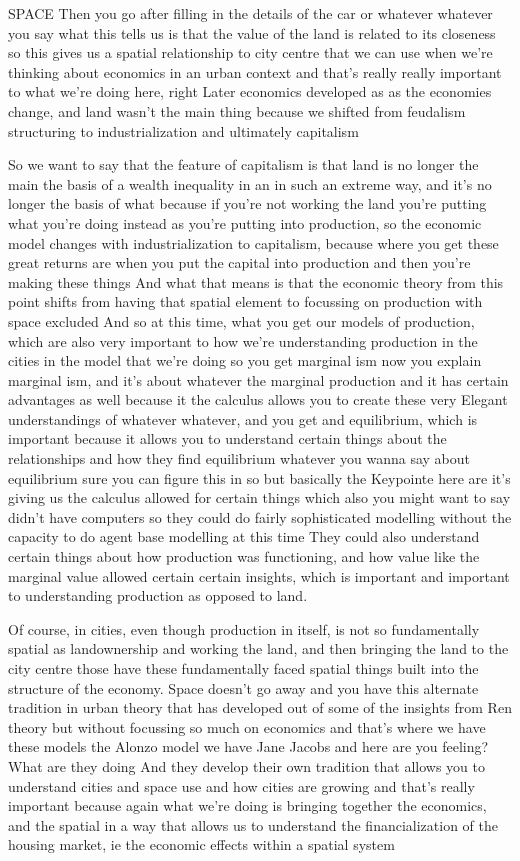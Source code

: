 SPACE
Then you go after filling in the details of the car or whatever whatever you say what this tells us is that the value of the land is related to its closeness so this gives us a spatial relationship to city centre that we can use when we’re thinking about economics in an urban context and that’s really really important to what we’re doing here, right
Later economics developed as as the economies change, and land wasn’t the main thing because we shifted from feudalism structuring to industrialization and ultimately capitalism

So we want to say that the feature of capitalism is that land is no longer the main the basis of a wealth inequality in an in such an extreme way, and it’s no longer the basis of what because if you’re not working the land you’re putting what you’re doing instead as you’re putting into production, so the economic model changes with industrialization to capitalism, because where you get these great returns are when you put the capital into production and then you’re making these things
And what that means is that the economic theory from this point shifts from having that spatial element to focussing on production with space excluded
And so at this time, what you get our models of production, which are also very important to how we’re understanding production in the cities in the model that we’re doing so you get marginal ism now you explain marginal ism, and it’s about whatever the marginal production and it has certain advantages as well because it the calculus allows you to create these very Elegant understandings of whatever whatever, and you get and equilibrium, which is important because it allows you to understand certain things about the relationships and how they find equilibrium whatever you wanna say about equilibrium sure you can figure this in so but basically the Keypointe here are it’s giving us the calculus allowed for certain things which also you might want to say didn’t have computers so they could do fairly sophisticated modelling without the capacity to do agent base modelling at this time They could also understand certain things about how production was functioning, and how value like the marginal value allowed certain certain insights, which is important and important to understanding production as opposed to land.

Of course, in cities, even though production in itself, is not so fundamentally spatial as landownership and working the land, and then bringing the land to the city centre those have these fundamentally faced spatial things built into the structure of the economy. Space doesn’t go away and you have this alternate tradition in urban theory that has developed out of some of the insights from Ren theory but without focussing so much on economics and that’s where we have these models the Alonzo model we have Jane Jacobs and here are you feeling? What are they doing And they develop their own tradition that allows you to understand cities and space use and how cities are growing and that’s really important because again what we’re doing is bringing together the economics, and the spatial in a way that allows us to understand the financialization of the housing market, ie the economic effects within a spatial system

